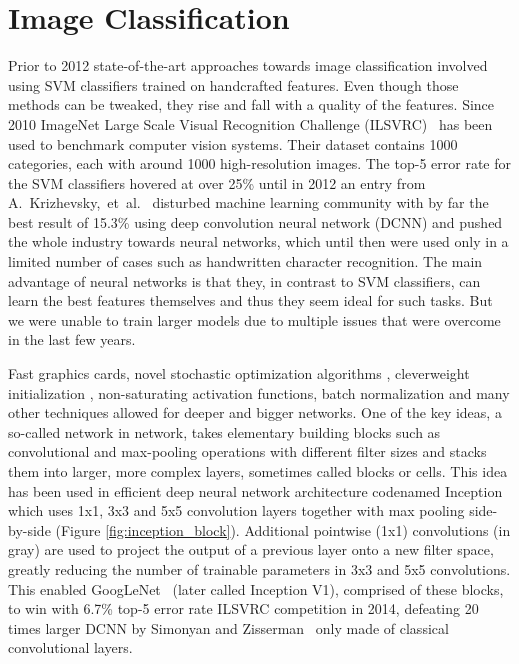 \section{Image Classification}
Prior to 2012 state-of-the-art approaches towards image classification involved using SVM classifiers trained on handcrafted features. Even though those methods can be tweaked, they rise and fall with a quality of the features. Since 2010 ImageNet Large Scale Visual Recognition Challenge (ILSVRC)~\cite{ILSVRC15} has been used to benchmark computer vision systems. Their dataset contains 1000 categories, each with around 1000 high-resolution images. The top-5 error rate for the SVM classifiers hovered at over 25\% until in 2012 an entry from A.~Krizhevsky,~et~al.~\cite{AlexNet} disturbed machine learning community with by far the best result of 15.3\% using deep convolution neural network (DCNN) and pushed the whole industry towards neural networks, which until then were used only in a limited number of cases such as handwritten character recognition. The main advantage of neural networks is that they, in contrast to SVM classifiers, can learn the best features themselves and thus they seem ideal for such tasks. But we were unable to train larger models due to multiple issues that were overcome in the last few years.

Fast graphics cards, novel stochastic optimization algorithms \cite{adam}, clever\linebreak[5] weight initialization \cite{glorot2010understanding}, non-saturating activation functions, batch normalization \cite{ioffe2015batch} and many other techniques allowed for deeper and bigger networks. One of the key ideas, a so-called network in network, takes elementary building blocks such as convolutional and max-pooling operations with different filter sizes and stacks them into larger, more complex layers, sometimes called blocks or cells. This idea has been used in efficient deep neural network architecture codenamed Inception~\cite{szegedy2015going} which uses 1x1, 3x3 and 5x5 convolution layers together with max pooling side-by-side (Figure \ref{fig:inception_block}). Additional pointwise (1x1) convolutions (in gray) are used to project the output of a previous layer onto a new filter space, greatly reducing the number of trainable parameters in 3x3 and 5x5 convolutions. This enabled GoogLeNet~\cite{szegedy2015going} (later called Inception V1), comprised of these blocks, to win with 6.7\% top-5 error rate ILSVRC competition in 2014, defeating 20 times larger DCNN by Simonyan and Zisserman~\cite{simonyan2014very} only made of classical convolutional layers.


